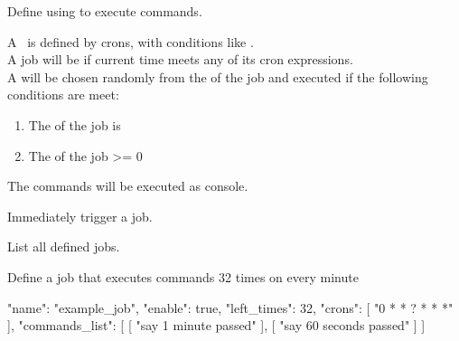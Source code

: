 \label{ch:command_scheduler}

Define  using  to execute commands.

A~ is defined by crons, with conditions like .\\
A job will be  if current time meets any of its cron expressions.\\
A  will be chosen randomly from the  of the job and executed if the following conditions are meet:
\begin{enumerate}
    \item The  of the job is 
    \item The  of the job >= 0
\end{enumerate}
The commands will be executed as console.

Immediately trigger a job.

List all defined jobs.

\begin{example}{Define a job that executes commands 32 times on every minute}
    \begin{jsoncode}
    {
        "name": "example_job",
        "enable": true,
        "left_times": 32,
        "crons": [
        "0 * * ? * * *"
        ],
        "commands_list": [
        [
        "say 1 minute passed"
        ],
        [
        "say 60 seconds passed"
        ]
        ]
    }
    \end{jsoncode}
\end{example}
